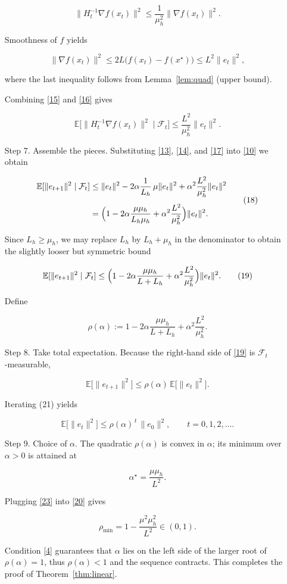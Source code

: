 \documentclass{article}
\newcommand{\E}{\mathbb{E}}
\begin{document}
\begin{enumerate}
\[
\|H_t^{-1}\nabla f(x_t)\|^{2}
\le
\frac{1}{\mu_h^{2}}\|\nabla f(x_t)\|^{2}.
\tag{15}
\]

Smoothness of $f$ yields  

\[
\|\nabla f(x_t)\|^{2}
\le
2L\bigl(f(x_t)-f(x^{\star})\bigr)
\le
L^{2}\|e_t\|^{2},
\tag{16}
\]

where the last inequality follows from Lemma~\ref{lem:quad} (upper bound).  

Combining \eqref{15} and \eqref{16} gives  

\[
\E\!\big[\|H_t^{-1}\nabla f(x_t)\|^{2}\mid\mathcal{F}_t\big]
\le
\frac{L^{2}}{\mu_h^{2}}\|e_t\|^{2}.
\tag{17}
\]

\item[Step 7.]  Assemble the pieces.  Substituting \eqref{13}, \eqref{14}, and \eqref{17} into \eqref{10} we obtain  

\[
\begin{aligned}
\E[\|e_{t+1}\|^{2}\mid\mathcal{F}_t]
&\le
\|e_t\|^{2}
-2\alpha\frac{1}{L_h}\,\mu\|e_t\|^{2}
+\alpha^{2}\frac{L^{2}}{\mu_h^{2}}\|e_t\|^{2}\\[4pt]
&=
\Bigl(1-2\alpha\frac{\mu\mu_h}{L_h\mu_h}
      +\alpha^{2}\frac{L^{2}}{\mu_h^{2}}\Bigr)\|e_t\|^{2}.
\end{aligned}
\tag{18}
\]

Since $L_h\ge\mu_h$, we may replace $L_h$ by $L_h+\mu_h$ in the denominator to obtain the slightly looser but symmetric bound  

\[
\E[\|e_{t+1}\|^{2}\mid\mathcal{F}_t]
\le
\Bigl(1-2\alpha\frac{\mu\mu_h}{L+L_h}
      +\alpha^{2}\frac{L^{2}}{\mu_h^{2}}\Bigr)\|e_t\|^{2}.
\tag{19}
\]

Define  

\[
\rho(\alpha):=
1-2\alpha\frac{\mu\mu_h}{L+L_h}
      +\alpha^{2}\frac{L^{2}}{\mu_h^{2}}.
\tag{20}
\]

\item[Step 8.]  Take total expectation.  Because the right‑hand side of \eqref{19} is $\mathcal{F}_t$‑measurable,  

\[
\E\!\big[\|e_{t+1}\|^{2}\big]
\le\rho(\alpha)\,\E\!\big[\|e_{t}\|^{2}\big].
\tag{21}
\]

Iterating (21) yields  

\[
\E\!\big[\|e_{t}\|^{2}\big]\le \rho(\alpha)^{\,t}\,\|e_{0}\|^{2},
\qquad t=0,1,2,\dots .
\tag{22}
\]

\item[Step 9.]  Choice of $\alpha$.  The quadratic $\rho(\alpha)$ is convex in $\alpha$; its minimum over $\alpha>0$ is attained at  

\[
\alpha^{\star}= \frac{\mu\mu_h}{L^{2}}.
\tag{23}
\]

Plugging \eqref{23} into \eqref{20} gives  

\[
\rho_{\min}=1-\frac{\mu^{2}\mu_h^{2}}{L^{2}} \in(0,1).
\tag{24}
\]

Condition \eqref{4} guarantees that $\alpha$ lies on the left side of the larger root of $\rho(\alpha)=1$, thus $\rho(\alpha)<1$ and the sequence contracts.  This completes the proof of Theorem~\ref{thm:linear}. \qedhere
\end{enumerate}
\end{document}
